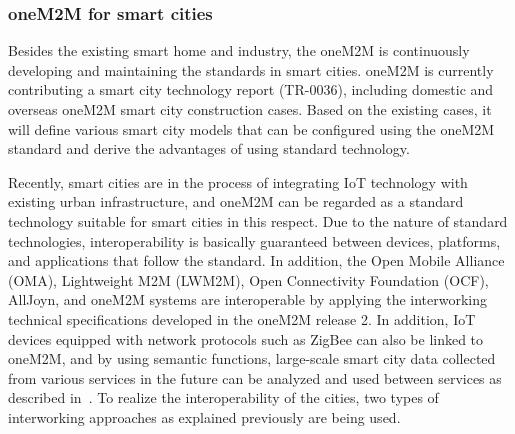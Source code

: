 \subsubsection{oneM2M for smart cities}
Besides the existing smart home and industry, the oneM2M is continuously developing and maintaining the standards in smart cities. oneM2M is currently contributing a smart city technology report (TR-0036), including domestic and overseas oneM2M smart city construction cases. Based on the existing cases, it will define various smart city models that can be configured using the oneM2M standard and derive the advantages of using standard technology.


Recently, smart cities are in the process of integrating IoT technology with existing urban infrastructure, and oneM2M can be regarded as a standard technology suitable for smart cities in this respect. Due to the nature of standard technologies, interoperability is basically guaranteed between devices, platforms, and applications that follow the standard. In addition, the Open Mobile Alliance (OMA), Lightweight M2M (LWM2M), Open Connectivity Foundation (OCF), AllJoyn, and oneM2M systems are interoperable by applying the interworking technical specifications developed in the oneM2M release 2. In addition, IoT devices equipped with network protocols such as ZigBee can also be linked to oneM2M, and by using semantic functions, large-scale smart city data collected from various services in the future can be analyzed and used between services as described in~\cite{onem2m_smart_cities_done_smarter}. To realize the interoperability of the cities, two types of interworking approaches as explained previously are being used.



